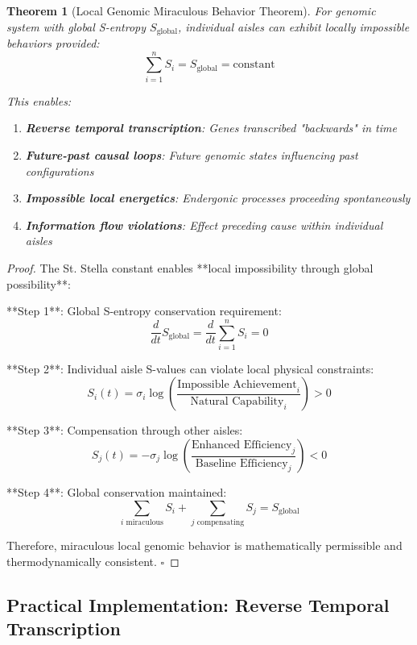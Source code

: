 \documentclass[12pt,a4paper]{article}
\newtheorem{theorem}{Theorem}[section]
\begin{document}
\begin{theorem}[Local Genomic Miraculous Behavior Theorem]
For genomic system with global S-entropy $S_{\text{global}}$, individual aisles can exhibit locally impossible behaviors provided:
$$\sum_{i=1}^{n} S_i = S_{\text{global}} = \text{constant}$$

This enables:
\begin{enumerate}
\item \textbf{Reverse temporal transcription}: Genes transcribed "backwards" in time
\item \textbf{Future-past causal loops}: Future genomic states influencing past configurations  
\item \textbf{Impossible local energetics}: Endergonic processes proceeding spontaneously
\item \textbf{Information flow violations}: Effect preceding cause within individual aisles
\end{enumerate}
\end{theorem}

\begin{proof}
The St. Stella constant enables **local impossibility through global possibility**:

**Step 1**: Global S-entropy conservation requirement:
$$\frac{d}{dt}S_{\text{global}} = \frac{d}{dt}\sum_{i=1}^{n} S_i = 0$$

**Step 2**: Individual aisle S-values can violate local physical constraints:
$$S_i(t) = \sigma_i \log\left(\frac{\text{Impossible Achievement}_i}{\text{Natural Capability}_i}\right) > 0$$

**Step 3**: Compensation through other aisles:
$$S_j(t) = -\sigma_j \log\left(\frac{\text{Enhanced Efficiency}_j}{\text{Baseline Efficiency}_j}\right) < 0$$

**Step 4**: Global conservation maintained:
$$\sum_{i \text{ miraculous}} S_i + \sum_{j \text{ compensating}} S_j = S_{\text{global}}$$

Therefore, miraculous local genomic behavior is mathematically permissible and thermodynamically consistent. $\square$
\end{proof}

\subsection{Practical Implementation: Reverse Temporal Transcription}
\end{document}

